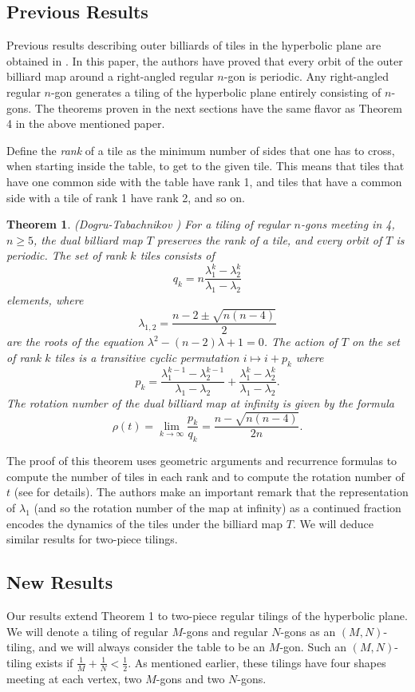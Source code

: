 \documentclass[11pt, oneside]{article}   	%
\newtheorem{theorem}{Theorem}
\begin{document}
\subsection{Previous Results}
\indent \indent Previous results describing outer billiards of tiles in the hyperbolic plane are obtained  in \cite{dogtab}. In this paper, the authors have proved that every orbit of the outer billiard map around a right-angled regular $n$-gon is periodic. Any right-angled regular $n$-gon generates a tiling of the hyperbolic plane entirely consisting of $n$-gons. The theorems proven in the next sections have the same flavor as Theorem 4 in the above mentioned paper.

\indent Define the \textit{rank} of a tile as the minimum number of sides that one has to cross, when starting inside the table, to get to the given tile. This means that tiles that have one common side with the table have rank 1, and tiles that have a common side with a tile of rank 1 have rank 2, and so on. 
\begin{theorem}
(Dogru-Tabachnikov \cite{dogtab})
For a tiling of regular $n$-gons meeting in 4, $n\geq 5$, the dual billiard map $T$ preserves the rank of a tile, and every orbit of $T$ is periodic. The set of rank $k$ tiles consists of 
\[q_k=n\frac{\lambda_1^k-\lambda_2^k}{\lambda_1-\lambda_2}\]
elements, where
\[\lambda_{1,2}=\frac{n-2\pm\sqrt{n(n-4)}}{2}\]
are the roots of the equation $\lambda^2-(n-2)\lambda+1=0$. The action of $T$ on the set of rank $k$ tiles is a transitive cyclic permutation $i\mapsto i+p_k$ where 
\[p_k=\frac{\lambda_1^{k-1}-\lambda_2^{k-1}}{\lambda_1-\lambda_2}+\frac{\lambda_1^k-\lambda_2^k}{\lambda_1-\lambda_2}.\]
The rotation number of the dual billiard map at infinity is given by the formula 
\[\rho(t)=\lim_{k\to\infty}\frac{p_k}{q_k}=\frac{n-\sqrt{n(n-4)}}{2n}.\]
\end{theorem} 
The proof of this theorem uses geometric arguments and recurrence formulas to compute the number of tiles in each rank and to compute the rotation number of $t$ (see \cite{dogtab} for details). The authors make an important remark that the representation of $\lambda_1$ (and so the rotation number of the map at infinity) as a continued fraction encodes the dynamics of the tiles under the billiard map $T$. We will deduce  similar results for two-piece tilings.
\subsection{New Results}
\indent \indent Our results extend Theorem 1 to two-piece regular tilings of the hyperbolic plane. We will denote a tiling of regular $M$-gons and regular $N$-gons as an $(M,N)$-tiling, and we will always consider the table to be an $M$-gon. Such an $(M,N)$-tiling exists if $\frac{1}{M}+\frac{1}{N}<\frac{1}{2}$. As mentioned earlier, these tilings have four shapes meeting at each vertex, two $M$-gons and two $N$-gons.%
\end{document}
